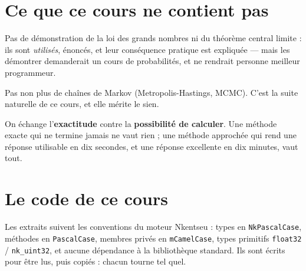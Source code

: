 \section{Ce que ce cours ne contient pas}

Pas de démonstration de la loi des grands nombres ni du théorème central
limite : ils sont \emph{utilisés}, énoncés, et leur conséquence pratique est
expliquée — mais les démontrer demanderait un cours de probabilités, et ne
rendrait personne meilleur programmeur.

Pas non plus de chaînes de Markov (Metropolis-Hastings, MCMC). C'est la suite
naturelle de ce cours, et elle mérite le sien.

\begin{nkretenir}
On échange l'\textbf{exactitude} contre la \textbf{possibilité de calculer}.
Une méthode exacte qui ne termine jamais ne vaut rien ; une méthode approchée
qui rend une réponse utilisable en dix secondes, et une réponse excellente en
dix minutes, vaut tout.
\end{nkretenir}

\section{Le code de ce cours}

Les extraits suivent les conventions du moteur Nkentseu : types en
\texttt{NkPascalCase}, méthodes en \texttt{PascalCase}, membres privés en
\texttt{mCamelCase}, types primitifs \texttt{float32} / \texttt{nk\_uint32}, et
aucune dépendance à la bibliothèque standard. Ils sont écrits pour être lus,
puis copiés : chacun tourne tel quel.
